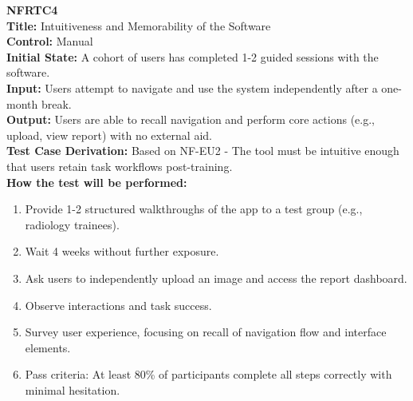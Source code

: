 \documentclass[12pt, titlepage]{article}
\begin{document}
\textbf{NFRTC4}\\
\textbf{Title:} Intuitiveness and Memorability of the Software\\
\textbf{Control:} Manual\\
\textbf{Initial State:} A cohort of users has completed 1-2 guided sessions with the software.\\
\textbf{Input:} Users attempt to navigate and use the system independently after a one-month break.\\
\textbf{Output:} Users are able to recall navigation and perform core actions (e.g., upload, view report) with no external aid.\\
\textbf{Test Case Derivation:} Based on NF-EU2 - The tool must be intuitive enough that users retain task workflows post-training.\\
\textbf{How the test will be performed:}
\begin{enumerate}
  \item Provide 1-2 structured walkthroughs of the app to a test group (e.g., radiology trainees).
  \item Wait 4 weeks without further exposure.
  \item Ask users to independently upload an image and access the report dashboard.
  \item Observe interactions and task success.
  \item Survey user experience, focusing on recall of navigation flow and interface elements.
  \item Pass criteria: At least 80\% of participants complete all steps correctly with minimal hesitation.
\end{enumerate}

\vspace{1em}
\end{document}
